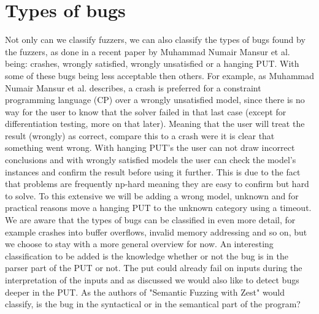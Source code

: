 \section{Types of bugs} 
\label{cha:2:TypesOfBugs}
Not only can we classify fuzzers, we can also classify the types of bugs found by the fuzzers, as done in a recent paper \cite{1mansur2020detecting} by Muhammad Numair Mansur et al. being: crashes, wrongly satisfied, wrongly unsatisfied or a hanging PUT. With some of these bugs being less acceptable then others. For example, as Muhammad Numair Mansur et al. describes, a crash is preferred for a constraint programming language (CP) over a wrongly unsatisfied model, since there is no way for the user to know that the solver failed in that last case (except for differentiation testing, more on that later). Meaning that the user will treat the result (wrongly) as correct, compare this to a crash were it is clear that something went wrong. With hanging PUT's the user can not draw incorrect conclusions and with wrongly satisfied models the user can check the model's instances and confirm the result before using it further. This is due to the fact that problems are frequently np-hard meaning they are easy to confirm but hard to solve. To this extensive we will be adding a wrong model, unknown and for practical reasons move a hanging PUT to the unknown category using a timeout. We are aware that the types of bugs can be classified in even more detail, for example crashes into buffer overflows, invalid memory addressing and so on, but we choose to stay with a more general overview for now. An interesting classification to be added is the knowledge whether or not the bug is in the parser part of the PUT or not. The put could already fail on inputs during the interpretation of the inputs and as discussed we would also like to detect bugs deeper in the PUT. As the authors of "Semantic Fuzzing with Zest" \cite{22SemanticFuzzing} would classify, is the bug in the syntactical or in the semantical part of the program?


